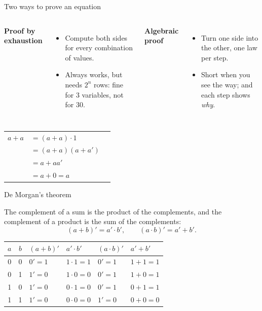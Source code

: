 \documentclass[10pt]{wosm-slides}
\makeatletter
\newenvironment{derivation}
  {\begin{tabular}{@{}r@{\;}l@{\qquad}l@{}}}
  {\end{tabular}}
\newcommand*\by[1]{\wosmlabel{#1}}
\makeatother
\begin{document}
\begin{frame}{Two ways to prove an equation}
  \begin{columns}[T, totalwidth=\textwidth]
      \textbf{Proof by exhaustion}
      \begin{itemize}
        \item Compute both sides for every combination of values.
        \item Always works, but needs $2^n$ rows: fine for 3 variables, not for 30.
      \end{itemize}
      \textbf{Algebraic proof}
      \begin{itemize}
        \item Turn one side into the other, one law per step.
        \item Short when you see the way; and each step shows \emph{why}.
      \end{itemize}
  \end{columns}

  \medskip
  \begin{example}
    \small
    \begin{derivation}
      $a + a$ & $= (a + a) \cdot 1$ & \by{identity} \\
              & $= (a + a)(a + a')$ & \by{complement} \\
              & $= a + a a'$ & \by{distributivity} \\
              & $= a + 0 = a$ & \by{complement, identity} \\
    \end{derivation}
  \end{example}
\end{frame}

\begin{frame}{De Morgan's theorem}
  \begin{theorem}[De Morgan]
    The complement of a sum is the product of the complements, and the complement
    of a product is the sum of the complements:
    \[ (a + b)' = a' \cdot b', \qquad (a \cdot b)' = a' + b'. \]
  \end{theorem}

  \begin{center}
    \small
    \begin{tabular}{@{}cc|ll|ll@{}}
      $a$ & $b$ & $(a + b)'$ & $a' \cdot b'$ & $(a \cdot b)'$ & $a' + b'$ \\
      \midrule
      0 & 0 & $0' = 1$ & $1 \cdot 1 = 1$ & $0' = 1$ & $1 + 1 = 1$ \\
      0 & 1 & $1' = 0$ & $1 \cdot 0 = 0$ & $0' = 1$ & $1 + 0 = 1$ \\
      1 & 0 & $1' = 0$ & $0 \cdot 1 = 0$ & $0' = 1$ & $0 + 1 = 1$ \\
      1 & 1 & $1' = 0$ & $0 \cdot 0 = 0$ & $1' = 0$ & $0 + 0 = 0$ \\
    \end{tabular}
  \end{center}
\end{frame}
\end{document}
